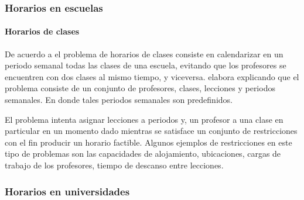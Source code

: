 \documentclass[spanish,draft,12pt,headsepline,footsepline,paper=letter]{scrreprt}
\begin{document}

\subsubsection{Horarios en escuelas}


\paragraph{Horarios de clases}

De acuerdo a \citet[p.~88]{schaerf99a-survey-of-automated} el problema de horarios de clases consiste en calendarizar en un periodo semanal todas las clases de una escuela, evitando que los profesores se encuentren con dos clases al mismo tiempo, y viceversa. \citet[p.~10,11]{abdullah06heuristic-approaches} elabora explicando que el problema consiste de un conjunto de profesores, clases, lecciones y periodos semanales. En donde tales periodos semanales son predefinidos.

El problema intenta asignar lecciones a periodos y, un profesor a una clase en particular en un momento dado mientras se satisface un conjunto de restricciones con el fin producir un horario factible. Algunos ejemplos de restricciones en este tipo de problemas son las capacidades de alojamiento, ubicaciones, cargas de trabajo de los profesores, tiempo de descanso entre lecciones.

\subsubsection{Horarios en universidades}
\end{document}
